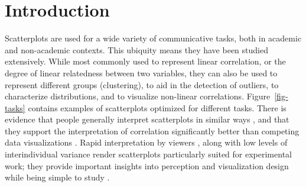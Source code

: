 \documentclass[manuscript, review, anonymous, screen]{acmart}
\begin{document}


\maketitle

\setlength{\parskip}{-0.1pt}

\hypertarget{introduction}{%
\section{Introduction}\label{introduction}}

Scatterplots are used for a wide variety of communicative tasks, both in
academic and non-academic contexts. This ubiquity means they have been
studied extensively. While most commonly used to represent linear
correlation, or the degree of linear relatedness between two variables,
they can also be used to represent different groups (clustering), to aid
in the detection of outliers, to characterize distributions, and to
visualize non-linear correlations. Figure~\ref{fig-tasks} contains
examples of scatterplots optimized for different tasks. There is
evidence that people generally interpret scatterplots in similar ways
\citep{kay_2015}, and that they support the interpretation of
correlation significantly better than competing data visualizations
\citep{li_2010}. Rapid interpretation by viewers \citep{rensink_2014},
along with low levels of interindividual variance render scatterplots
particularly suited for experimental work; they provide important
insights into perception and visualization design while being simple to
study \citep{rensink_2014}.
\end{document}
